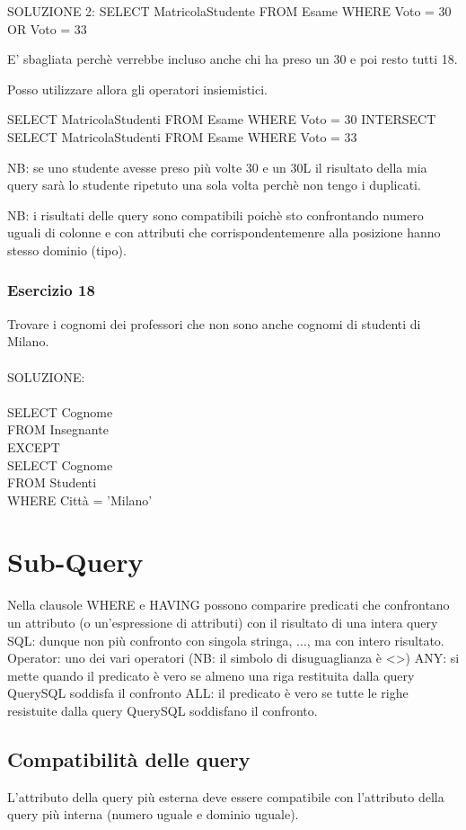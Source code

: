 \documentclass{article}
\begin{document}
SOLUZIONE 2:
SELECT MatricolaStudente
FROM Esame
WHERE Voto = 30 OR Voto = 33

E' sbagliata perchè verrebbe incluso anche chi ha preso un 30 e poi resto tutti 18.

Posso utilizzare allora gli operatori insiemistici.

SELECT MatricolaStudenti
FROM Esame
WHERE Voto = 30
INTERSECT
SELECT MatricolaStudenti
FROM Esame
WHERE Voto = 33

NB: se uno studente avesse preso più volte 30 e un 30L il risultato della mia query sarà lo studente ripetuto una sola volta perchè non tengo i duplicati.

NB: i risultati delle query sono compatibili poichè sto confrontando numero uguali di colonne e con attributi che corrispondentemenre alla posizione hanno stesso dominio (tipo).

\subsubsection{Esercizio 18}
Trovare i cognomi dei professori che non sono anche cognomi di studenti di Milano.\\
\\
SOLUZIONE:\\
\\
SELECT Cognome\\
FROM Insegnante\\
EXCEPT\\
SELECT Cognome\\
FROM Studenti\\
WHERE Città = 'Milano'\\

\section{Sub-Query}
Nella clausole WHERE e HAVING possono comparire predicati che confrontano un attributo (o un'espressione di attributi) con il risultato di una intera query SQL: dunque non più confronto con singola stringa, ..., ma con intero risultato.\\

Operator: uno dei vari operatori (NB: il simbolo di disuguaglianza è <>)
ANY: si mette quando il predicato è vero se almeno una riga restituita dalla query QuerySQL soddisfa il confronto 
ALL: il predicato è vero se tutte le righe resistuite dalla query QuerySQL soddisfano il confronto.

\subsection{Compatibilità delle query}
L'attributo della query più esterna deve essere compatibile con l'attributo della query più interna (numero uguale e dominio uguale).
\end{document}
